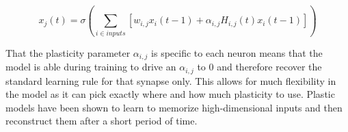 \[ x_j(t) = \sigma \left( \sum_{i\in inputs} [ w_{i,j}x_i(t-1) + \alpha_{i,j}H_{i,j}(t)x_i(t-1) ] \right) \]

That the plasticity parameter \(\alpha_{i,j}\) is specific to each neuron means that the model is able during training to drive an \(\alpha_{i,j}\) to 0 and therefore recover the standard learning rule for that synapse only. This allows for much flexibility in the model as it can pick exactly where and how much plasticity to use.
Plastic models have been shown to learn to memorize high-dimensional inputs and then reconstruct them after a short period of time.